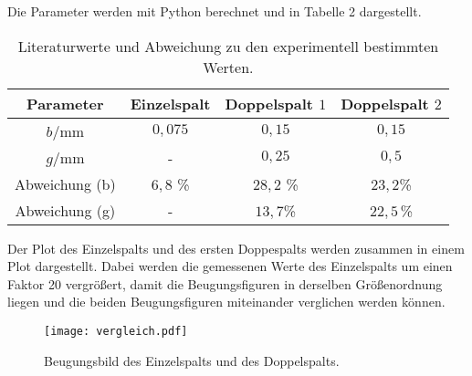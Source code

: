Die Parameter werden mit Python berechnet und in Tabelle 2 dargestellt.
\begin{table}[H]
  \centering
  \caption{Literaturwerte \cite{sample} und Abweichung zu den experimentell bestimmten Werten.}
  \label{tab:Parameter}
  \begin{tabular}{c c c c}
    \toprule
    Parameter & Einzelspalt & Doppelspalt $1$ & Doppelspalt $2$ \\
    \midrule
     $b/$mm & $0,075$ & $0,15$ & $0,15$ \\
     $g/$mm & - & $0,25$ & $0,5$  \\
     \midrule
     Abweichung (b) & $6,8$ \% & $28,2$ \% & $23,2$\% \\
     Abweichung (g) & - & $13,7 $\% & $22,5\,$\% \\
    \bottomrule
  \end{tabular}
\end{table}


Der Plot des Einzelspalts und des ersten Doppespalts werden zusammen in einem Plot dargestellt. Dabei werden die gemessenen Werte des Einzelspalts um einen Faktor
20 vergrößert, damit die Beugungsfiguren in derselben Größenordnung liegen und die beiden Beugungsfiguren miteinander verglichen werden können.

\begin{figure}
  \centering
  \texttt{[image: vergleich.pdf]}
  \caption{Beugungsbild des Einzelspalts und des Doppelspalts.}
  \label{fig:plot}
\end{figure}

